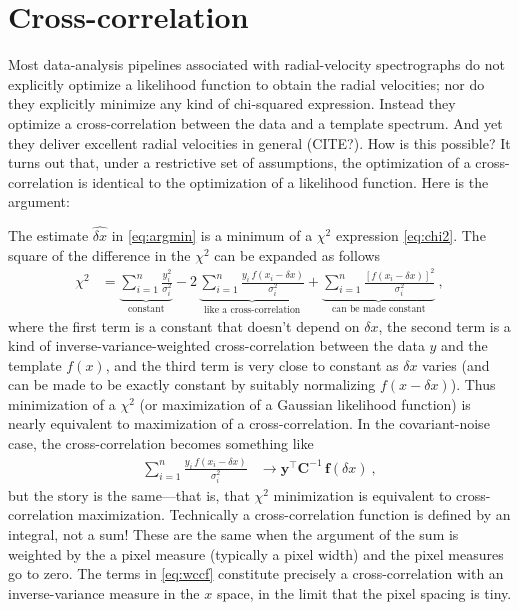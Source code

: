 \documentclass[modern]{aastex631}
\newcommand{\lao}[1]{\boldsymbol{#1}}
\newcommand{\vy}{\lao{y}}
\newcommand{\vf}{\lao{f}}
\newcommand{\vC}{\lao{C}}
\begin{document}
\section{Cross-correlation}\label{sec:ccf}

Most data-analysis pipelines associated with radial-velocity spectrographs do not explicitly optimize a likelihood function to obtain the radial velocities; nor do they explicitly minimize any kind of chi-squared expression.
Instead they optimize a cross-correlation between the data and a template spectrum.
And yet they deliver excellent radial velocities in general (CITE?).
How is this possible?
It turns out that, under a restrictive set of assumptions, the optimization of a cross-correlation is identical to the optimization of a likelihood function.
Here is the argument:

The estimate $\widehat{\delta x}$ in \eqref{eq:argmin} is a minimum of a $\chi^2$ expression \eqref{eq:chi2}.
The square of the difference in the $\chi^2$ can be expanded as follows
\begin{align}\label{eq:chi2ccf}
    \chi^2 &= \underbrace{\sum_{i=1}^n \frac{y_i^2}{\sigma_i^2}}_{\text{constant}}
         - 2\,\underbrace{\sum_{i=1}^n \frac{y_i\,f(x_i - \delta x)}{\sigma_i^2}}_{\text{like a cross-correlation}}
         +    \underbrace{\sum_{i=1}^n \frac{[f(x_i - \delta x)]^2}{\sigma_i^2}}_{\text{can be made constant}} ~,
\end{align}
where the first term is a constant that doesn't depend on $\delta x$,
the second term is a kind of inverse-variance-weighted cross-correlation between the data $y$ and the template $f(x)$,
and the third term is very close to constant as $\delta x$ varies (and can be made to be exactly constant by suitably normalizing $f(x-\delta x)$).
Thus minimization of a $\chi^2$ (or maximization of a Gaussian likelihood function) is nearly equivalent to maximization of a cross-correlation.
In the covariant-noise case, the cross-correlation becomes something like
\begin{align}
    \sum_{i=1}^n \frac{y_i\,f(x_i - \delta x)}{\sigma_i^2} &\rightarrow \vy^\top\vC^{-1}\,\vf(\delta x)\label{eq:wccf} ~,
\end{align}
but the story is the same---that is, that $\chi^2$ minimization is equivalent to cross-correlation maximization.
Technically a cross-correlation function is defined by an integral, not a sum!
These are the same when the argument of the sum is weighted by the a pixel measure (typically a pixel width) and the pixel measures  go to zero.
The terms in \eqref{eq:wccf} constitute precisely a cross-correlation with an inverse-variance measure in the $x$ space, in the limit that the pixel spacing is tiny.
\end{document}
